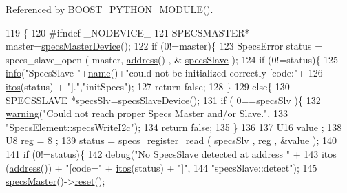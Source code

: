 Referenced by B\+O\+O\+S\+T\+\_\+\+P\+Y\+T\+H\+O\+N\+\_\+\+M\+O\+D\+U\+L\+E().


\begin{DoxyCode}
119                         \{
120 \textcolor{preprocessor}{#ifndef \_NODEVICE\_
}
121   SPECSMASTER* master=\hyperlink{classSpecsInterface_aa8aeaa74acf2c913905ea996d153a6ef}{specsMasterDevice}();
122   \textcolor{keywordflow}{if} (0!=master)\{
123     SpecsError status = specs\_slave\_open ( master, \hyperlink{classSpecsInterface_a0fa039a15b842a5ba783ce825b9915d8}{address}() , &
      \hyperlink{classSpecsInterface_a13cf39bddfa8ba21d6e6aa78e78f0e4f}{specsSlave} );
124     \textcolor{keywordflow}{if} (0!=status)\{
125       \hyperlink{classObject_a644fd329ea4cb85f54fa6846484b84a8}{info}(\textcolor{stringliteral}{"SpecsSlave "}+\hyperlink{classObject_a300f4c05dd468c7bb8b3c968868443c1}{name}()+\textcolor{stringliteral}{"could not be initialized correctly [code:"}+
126            \hyperlink{Tools_8h_af330027dbdafb9a30768b3613c553e60}{itos}(status) + \textcolor{stringliteral}{"]."},\textcolor{stringliteral}{"initSpecs"});
127       \textcolor{keywordflow}{return} \textcolor{keyword}{false};
128     \}
129     \textcolor{keywordflow}{else}\{
130       SPECSSLAVE *specsSlv=\hyperlink{classSpecsSlave_a44970aca61b6fdcd6d6d90e6601093f3}{specsSlaveDevice}();
131       \textcolor{keywordflow}{if} ( 0==specsSlv )\{
132         \hyperlink{classObject_a65cd4fda577711660821fd2cd5a3b4c9}{warning}(\textcolor{stringliteral}{"Could not reach proper Specs Master and/or Slave."},
133                 \textcolor{stringliteral}{"SpecsElement::specsWriteI2c"});
134         \textcolor{keywordflow}{return} \textcolor{keyword}{false};
135       \}
136       
137       \hyperlink{ICECALv3_8h_adf928e51a60dba0df29d615401cc55a8}{U16} value ;
138       \hyperlink{ICECALv3_8h_a3cb25ca6f51f003950f9625ff05536fc}{U8} reg = 8 ;
139       status = specs\_register\_read ( specsSlv , reg , &value );
140       
141       \textcolor{keywordflow}{if} (0!=status)\{
142         \hyperlink{classObject_aac010553f022165573714b7014a15f0d}{debug}(\textcolor{stringliteral}{"No SpecsSlave detected at address "} + 
143               \hyperlink{Tools_8h_af330027dbdafb9a30768b3613c553e60}{itos} (\hyperlink{classSpecsInterface_a0fa039a15b842a5ba783ce825b9915d8}{address}()) + \textcolor{stringliteral}{"[code="} + \hyperlink{Tools_8h_af330027dbdafb9a30768b3613c553e60}{itos}(status) + \textcolor{stringliteral}{"]"},
144               \textcolor{stringliteral}{"specsSlave::detect"});
145         \hyperlink{classSpecsInterface_a3d497c965fb6ec06b49a54b7901a22b2}{specsMaster}()->\hyperlink{classSpecsMaster_a0cbd251edefae5f154ec21b1b944d153}{reset}();

\end{DoxyCode}
